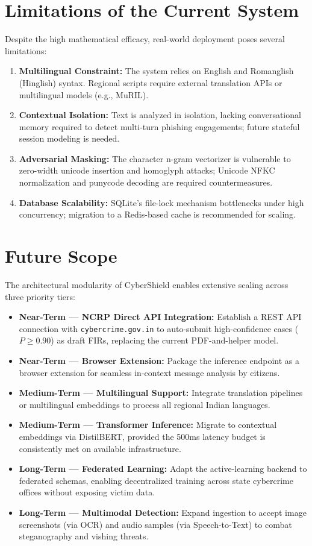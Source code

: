 \section{Limitations of the Current System}
Despite the high mathematical efficacy, real-world deployment poses several limitations:
\begin{enumerate}
    \item \textbf{Multilingual Constraint:} The system relies on English and Romanglish (Hinglish) syntax. Regional scripts require external translation APIs or multilingual models (e.g., MuRIL).
    \item \textbf{Contextual Isolation:} Text is analyzed in isolation, lacking conversational memory required to detect multi-turn phishing engagements; future stateful session modeling is needed.
    \item \textbf{Adversarial Masking:} The character n-gram vectorizer is vulnerable to zero-width unicode insertion and homoglyph attacks; Unicode NFKC normalization and punycode decoding are required countermeasures.
    \item \textbf{Database Scalability:} SQLite's file-lock mechanism bottlenecks under high concurrency; migration to a Redis-based cache is recommended for scaling.
\end{enumerate}

\section{Future Scope}
The architectural modularity of CyberShield enables extensive scaling across three priority tiers:
\begin{itemize}
    \item \textbf{Near-Term --- NCRP Direct API Integration:} Establish a REST API connection with \texttt{cybercrime.gov.in} to auto-submit high-confidence cases ($P \geq 0.90$) as draft FIRs, replacing the current PDF-and-helper model.
    \item \textbf{Near-Term --- Browser Extension:} Package the inference endpoint as a browser extension for seamless in-context message analysis by citizens.
    \item \textbf{Medium-Term --- Multilingual Support:} Integrate translation pipelines or multilingual embeddings to process all regional Indian languages.
    \item \textbf{Medium-Term --- Transformer Inference:} Migrate to contextual embeddings via DistilBERT, provided the 500ms latency budget is consistently met on available infrastructure.
    \item \textbf{Long-Term --- Federated Learning:} Adapt the active-learning backend to federated schemas, enabling decentralized training across state cybercrime offices without exposing victim data.
    \item \textbf{Long-Term --- Multimodal Detection:} Expand ingestion to accept image screenshots (via OCR) and audio samples (via Speech-to-Text) to combat steganography and vishing threats.
\end{itemize}
